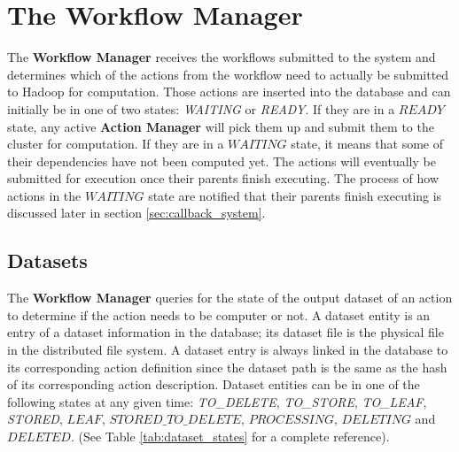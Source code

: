 \section{The Workflow Manager}
The \textbf{Workflow Manager} receives the workflows submitted to the system and determines which of the actions from the workflow need to actually be submitted to Hadoop for computation. Those actions are inserted into the database and can initially be in one of two states: \textit{WAITING} or \textit{READY}. If they are in a $READY$ state, any active \textbf{Action Manager} will pick them up and submit them to the cluster for computation. If they are in a $WAITING$ state, it means that some of their dependencies have not been computed yet. The actions will eventually be submitted for execution once their parents finish executing. The process of how actions in the $WAITING$ state are notified that their parents finish executing is discussed later in section \ref{sec:callback_system}.

\subsection{Datasets}
The \textbf{Workflow Manager} queries for the state of the output dataset of an action to determine if the action needs to be computer or not.  A dataset entity is an entry of a dataset information in the database; its dataset file is the physical file in the distributed file system. A dataset entry is always linked in the database to its corresponding action definition since the dataset path is the same as the hash of its corresponding action description. Dataset entities can be in one of the following states at any given time: \textit{TO\_DELETE}, \textit{TO\_STORE}, \textit{TO\_LEAF}, \textit{STORED}, $LEAF$, $STORED\_TO\_DELETE$, $PROCESSING$, $DELETING$ and $DELETED$. (See Table \ref{tab:dataset_states} for a complete reference).

